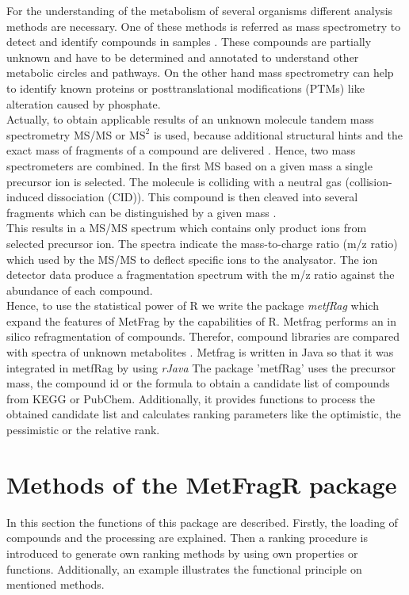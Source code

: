 \documentclass[12pt, a4paper]{scrartcl}
\newcommand{\Rpackage}[1]{{\textit{#1}}}
\begin{document}
For the understanding of the metabolism of several organisms different analysis methods
are necessary. One of these methods is referred as mass spectrometry to detect and identify compounds 
in samples \cite{Dunn2008}. These compounds are partially unknown and have to be determined and annotated
to understand other metabolic circles and pathways. On the other hand mass spectrometry can help to 
identify known proteins or posttranslational modifications (PTMs) like alteration caused by phosphate. \\[0.5em]
Actually, to obtain applicable results of an unknown molecule tandem mass spectrometry MS/MS or \(\text{MS}^\text{2}\) 
is used, because additional structural hints and the exact mass of fragments of a compound are delivered \cite{Wolf2010}.
Hence, two mass spectrometers are combined. In the first MS based on a given mass a single precursor ion is selected. 
The molecule is colliding with a neutral gas (collision-induced dissociation (CID)). This compound is then cleaved into
several fragments which can be distinguished by a given mass \cite{Jeol2006}. \\[0.5em]
This results in a MS/MS spectrum which contains only product ions from selected precursor ion. 
The spectra indicate the mass-to-charge ratio (m/z ratio) which used by the MS/MS to deflect specific ions to the analysator. 
The ion detector data produce a fragmentation spectrum with the m/z ratio against the abundance of each compound. \\[0.5em]
Hence, to use the statistical power of R we write the package \Rpackage{metfRag} which expand the features of 
MetFrag by the capabilities of R. Metfrag performs an in silico refragmentation of compounds. 
Therefor, compound libraries are compared with spectra of unknown metabolites \cite{Wolf2010}.
Metfrag is written in Java so that it was integrated in metfRag by using \Rpackage{rJava} \cite{Urbanek2013}
The package 'metfRag' uses the precursor mass, the compound id or the formula to obtain a candidate list of compounds 
from KEGG or PubChem. Additionally, it provides functions to process the obtained candidate list and calculates ranking parameters
like the optimistic, the pessimistic or the relative rank.

\newpage
\section{Methods of the MetFragR package}
In this section the functions of this package are described. Firstly, the loading of compounds
and the processing are explained. Then a ranking procedure is introduced to generate own ranking methods by
using own properties or functions. Additionally, an example illustrates the functional principle
on mentioned methods. 
\end{document}
